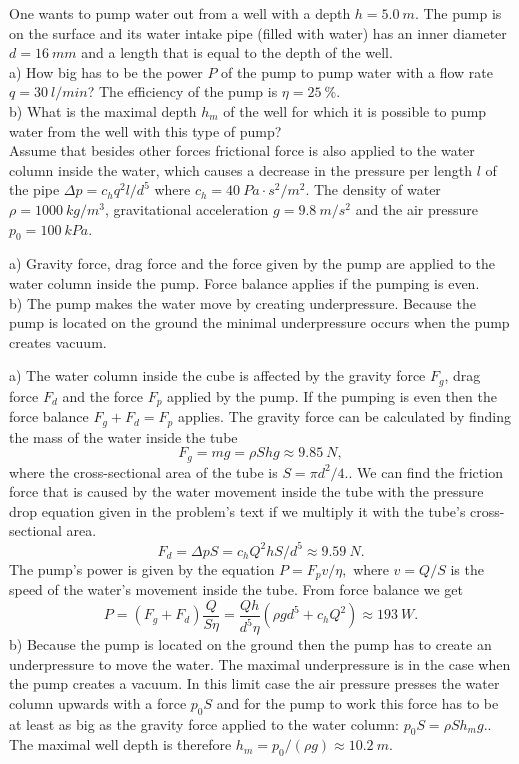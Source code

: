 {\ifEngStatement
One wants to pump water out from a well with a depth $h=\SI{5.0}{m}$. The pump is on the surface and its water intake pipe (filled with water) has an inner diameter $d=\SI{16}{mm}$ and a length that is equal to the depth of the well.\\
a) How big has to be the power $P$ of the pump to pump water with a flow rate $q=\SI{30}{l/min}$? The efficiency of the pump is $\eta=\SI{25}{\percent}$.\\
b) What is the maximal depth $h_{m}$ of the well for which it is possible to pump water from the well with this type of pump?\\
Assume that besides other forces frictional force is also applied to the water column inside the water, which causes a decrease in the pressure per length $l$ of the pipe $\Delta p=c_{h}q^{2}l/d^{5}$ where $c_{h}=\SI{40}{Pa\cdot s^{2}/m^{2}}$. The density of water $\rho=\SI{1000}{kg/m^{3}}$, gravitational acceleration $g=\SI{9.8}{m/s^{2}}$ and the air pressure $p_{0}=\SI{100}{kPa}$.
\fi


\ifEngHint
a) Gravity force, drag force and the force given by the pump are applied to the water column inside the pump. Force balance applies if the pumping is even.\\ 
b) The pump makes the water move by creating underpressure. Because the pump is located on the ground the minimal underpressure occurs when the pump creates vacuum.
\fi


\ifEngSolution
a) The water column inside the cube is affected by the gravity force $F_{g}$, drag force $F_{d}$ and the force $F_{p}$ applied by the pump. If the pumping is even then the force balance $F_{g}+F_{d}=F_{p}$ applies. The gravity force can be calculated by finding the mass of the water inside the tube
\[
F_{g}=mg=\rho Shg\approx\SI{9.85}{N},
\]
where the cross-sectional area of the tube is $S=\pi d^{2}/4.$. We can find the friction force that is caused by the water movement inside the tube with the pressure drop equation given in the problem’s text if we multiply it with the tube’s cross-sectional area. 
\[
F_{d}=\Delta pS=c_{h}Q^{2}hS/d^{5}\approx\SI{9.59}{N}.
\]
The pump’s power is given by the equation $P=F_{p}v/\eta,$ where $v=Q/S$ is the speed of the water’s movement inside the tube. From force balance we get
\[
P=\left(F_{g}+F_{d}\right)\frac{Q}{S\eta}=\frac{Qh}{d^{5}\eta}\left(\rho gd^{5}+c_{h}Q^{2}\right)\approx\SI{193}{W}.
\]
b) Because the pump is located on the ground then the pump has to create an underpressure to move the water. The maximal underpressure is in the case when the pump creates a vacuum. In this limit case the air pressure presses the water column upwards with a force $p_{0}S$ and for the pump to work this force has to be at least as big as the gravity force applied to the water column: $p_{0}S=\rho Sh_{m}g.$. The maximal well depth is therefore $h_{m}=p_{0}/\left(\rho g\right)\approx\SI{10.2}{m}$.
\fi
}